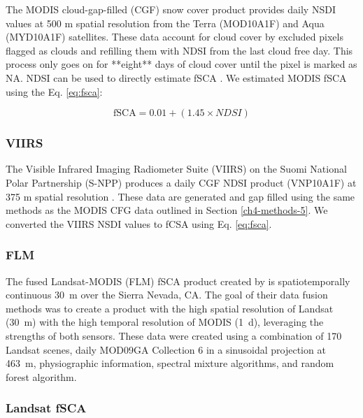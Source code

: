 The MODIS cloud-gap-filled (CGF) snow cover product \citep{hallEvaluationMODISVIIRS2019} provides daily NSDI values at 500 m spatial resolution from the Terra (MOD10A1F) and Aqua (MYD10A1F) satellites. These data account for cloud cover by excluded pixels  flagged as clouds and refilling them with NDSI from the last cloud free day. This process only goes on for **eight** days of cloud cover until the pixel is marked as NA. NDSI can be used to directly estimate fSCA \citep{salomonsonEstimatingFractionalSnow2004, salomonsonDevelopmentAquaMODIS2006,stillingerLandsatMODISVIIRS2023}. We estimated MODIS fSCA using the Eq. \ref{eq:fsca}:

\begin{equation}
\text{fSCA} = 0.01 + (1.45 \times NDSI)
\label{eq:fsca}
\end{equation}


\hypertarget{ch4-methods-6}{\subsubsection{VIIRS}\label{ch4-methods-6}}

The Visible Infrared Imaging Radiometer Suite (VIIRS) on the Suomi National Polar Partnership (S-NPP) produces a daily CGF NDSI product (VNP10A1F) at 375 m spatial resolution \citep{hallEvaluationMODISVIIRS2019}. These data are generated and gap filled using the same methods as the MODIS CFG data outlined in Section \ref{ch4-methods-5}. We converted the VIIRS NSDI values to fCSA using Eq. \ref{eq:fsca}.


\hypertarget{ch4-methods-7}{\subsubsection{FLM}\label{ch4-methods-7}}

The fused Landsat-MODIS (FLM) fSCA product created by \cite{rittgerMultisensorFusionUsing2021} is spatiotemporally continuous 30~m over the Sierra Nevada, CA. The goal of their data fusion methods was to create a product with the high spatial resolution of Landsat (30~m) with the high temporal resolution of MODIS (1~d), leveraging the strengths of both sensors. These data were created using a combination of 170 Landsat scenes, daily MOD09GA Collection 6 in a sinusoidal projection at 463~m, physiographic information, spectral mixture algorithms, and random forest algorithm. 

\hypertarget{ch4-methods-8}{\subsubsection{Landsat fSCA}\label{ch4-methods-8}}


